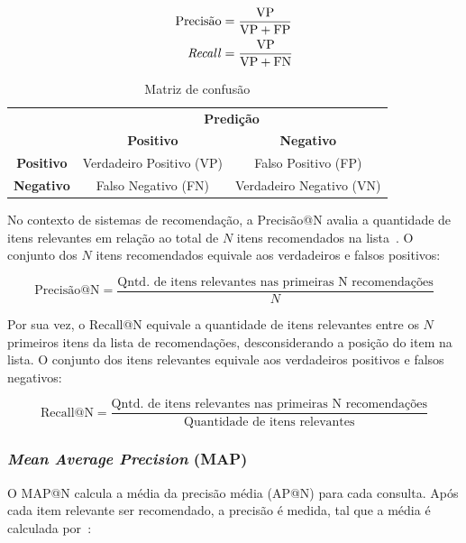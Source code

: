   \begin{align}
    \text{Precisão} &= \frac{\text{VP}}{\text{VP} + \text{FP}} \\
    \text{\textit{Recall}} &= \frac{\text{VP}}{\text{VP} + \text{FN}}
  \end{align}

  \begin{table}[H]
    \centering
    \begin{tabular}{c|c|c|}
      \cline{2-3}
      & \multicolumn{2}{c|}{\textbf{Predição}} \\ \cline{2-3} 
      & \textbf{Positivo} & \textbf{Negativo} \\ \hline
      \multicolumn{1}{|c|}{\textbf{Positivo}} & Verdadeiro Positivo (VP) & Falso Positivo (FP) \\ \hline
      \multicolumn{1}{|c|}{\textbf{Negativo}} & Falso Negativo (FN) & Verdadeiro Negativo (VN) \\ \hline
    \end{tabular}
    \caption{Matriz de confusão}
    \label{tab:confusion_matrix}
  \end{table}

  No contexto de sistemas de recomendação, a Precisão@N avalia a quantidade de
  itens relevantes em relação ao total de $N$ itens recomendados na lista~\cite{sessionbaseddp}. O conjunto
  dos $N$ itens recomendados equivale aos verdadeiros e falsos positivos:

  \begin{equation}
    \text{Precisão@N} = \frac{\text{Qntd. de itens relevantes nas primeiras N recomendações}}{N}
  \end{equation}

  Por sua vez, o Recall@N equivale a quantidade de itens relevantes entre
  os $N$ primeiros itens da lista de recomendações, desconsiderando a
  posição do item na lista. O conjunto dos itens relevantes equivale
  aos verdadeiros positivos e falsos negativos:

  \begin{equation}
    \text{Recall@N} = \frac{\text{Qntd. de itens relevantes nas primeiras N recomendações}}{\text{Quantidade de itens relevantes}}
  \end{equation}

  \subsubsection{\textit{Mean Average Precision} (MAP)} O MAP@N calcula a média
  da precisão média (AP@N) para cada consulta. Após cada item relevante ser
  recomendado, a precisão é medida, tal que a média é calculada por~\cite{carnevali2023offline}:

